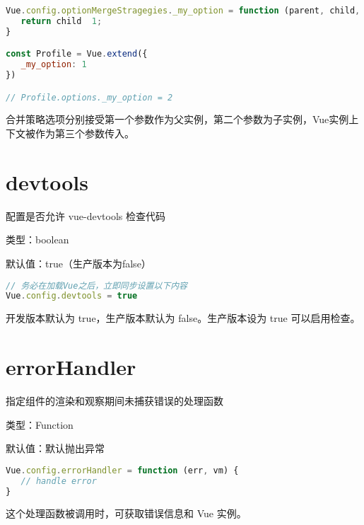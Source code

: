 \begin{lstlisting}[language=JavaScript]
Vue.config.optionMergeStragegies._my_option = function (parent, child, vm) {
   return child  1;
}

const Profile = Vue.extend({
   _my_option: 1
})

// Profile.options._my_option = 2
\end{lstlisting}


合并策略选项分别接受第一个参数作为父实例，第二个参数为子实例，Vue实例上下文被作为第三个参数传入。

\section{devtools}


配置是否允许 vue-devtools 检查代码

\begin{compactitem}
\item 类型：boolean
\item 默认值：true（生产版本为false）
\end{compactitem}



\begin{lstlisting}[language=JavaScript]
// 务必在加载Vue之后，立即同步设置以下内容
Vue.config.devtools = true
\end{lstlisting}

开发版本默认为 true，生产版本默认为 false。生产版本设为 true 可以启用检查。


\section{errorHandler}

指定组件的渲染和观察期间未捕获错误的处理函数

\begin{compactitem}
\item 类型：Function
\item 默认值：默认抛出异常
\end{compactitem}



\begin{lstlisting}[language=JavaScript]
Vue.config.errorHandler = function (err, vm) {
   // handle error
}
\end{lstlisting}

这个处理函数被调用时，可获取错误信息和 Vue 实例。



